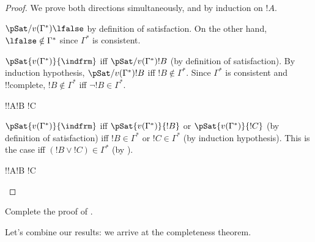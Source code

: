 \begin{proof}
We prove both directions simultaneously, and by induction on $!A$.
\begin{enumerate}
  {$\pSat/{v(\Gamma^*)}{\lfalse}$
    by definition of satisfaction. On the other hand, $\lfalse \notin
    \Gamma^*$ since $\Gamma^*$ is consistent.}





    {$\pSat{v(\Gamma^*)}{\indfrm}$ iff
    $\pSat/{v(\Gamma^*)}{!B}$ (by
    definition of satisfaction). By induction hypothesis,
    $\pSat/{v(\Gamma^*)}{!B}$ iff
    $!B \notin \Gamma^*$. Since $\Gamma^*$ is consistent and
    !!{complete}, $!B
    \notin \Gamma^*$ iff $\lnot !B \in \Gamma^*$.}



  \indcase!{!A}{!B \land !C}{}



    {$\pSat{v(\Gamma^*)}{\indfrm}$
    iff $\pSat{v(\Gamma^*)}{!B}$ or
    $\pSat{v(\Gamma^*)}{!C}$ (by
    definition of satisfaction) iff $!B \in \Gamma^*$ or $!C \in
    \Gamma^*$ (by induction hypothesis). This is the case iff $(!B
    \lor !C) \in \Gamma^*$ (by
    ).}
  


  \indcase!{!A}{!B \lif !C}{}


\end{enumerate}
\end{proof}






\begin{prob}
Complete the proof of .
\end{prob}











\begin{explain}
Let's combine our results: we arrive at the completeness theorem.
\end{explain}

